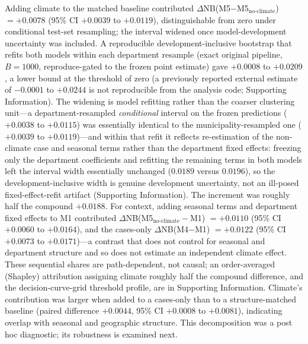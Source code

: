 \documentclass[11pt,a4paper]{article}
\begin{document}
Adding climate to the matched baseline contributed $\Delta$NB(M5$-$M5$_{\text{no-climate}}$) $=+0.0078$ (95\% CI $+0.0039$ to $+0.0119$), distinguishable from zero under conditional test-set resampling; the interval widened once model-development uncertainty was included. A reproducible development-inclusive bootstrap that refits both models within each department resample (exact original pipeline, $B=1000$, reproduce-gated to the frozen point estimate) gave $+0.0008$ to $+0.0209$, a lower bound at the threshold of zero (a previously reported external estimate of $-0.0001$ to $+0.0244$ is not reproducible from the analysis code; Supporting Information). The widening is model refitting rather than the coarser clustering unit---a department-resampled \emph{conditional} interval on the frozen predictions ($+0.0038$ to $+0.0115$) was essentially identical to the municipality-resampled one ($+0.0039$ to $+0.0119$)---and within that refit it reflects re-estimation of the non-climate case and seasonal terms rather than the department fixed effects: freezing only the department coefficients and refitting the remaining terms in both models left the interval width essentially unchanged ($0.0189$ versus $0.0196$), so the development-inclusive width is genuine development uncertainty, not an ill-posed fixed-effect-refit artifact (Supporting Information). The increment was roughly half the compound $+0.0188$. For context, adding seasonal terms and department fixed effects to M1 contributed $\Delta$NB(M5$_{\text{no-climate}}-$M1) $=+0.0110$ (95\% CI $+0.0060$ to $+0.0164$), and the cases-only $\Delta$NB(M4$-$M1) $=+0.0122$ (95\% CI $+0.0073$ to $+0.0171$)---a contrast that does not control for seasonal and department structure and so does not estimate an independent climate effect. These sequential shares are path-dependent, not causal; an order-averaged (Shapley) attribution assigning climate roughly half the compound difference, and the decision-curve-grid threshold profile, are in Supporting Information. Climate's contribution was larger when added to a cases-only than to a structure-matched baseline (paired difference $+0.0044$, 95\% CI $+0.0008$ to $+0.0081$), indicating overlap with seasonal and geographic structure. This decomposition was a post hoc diagnostic; its robustness is examined next.
\end{document}
